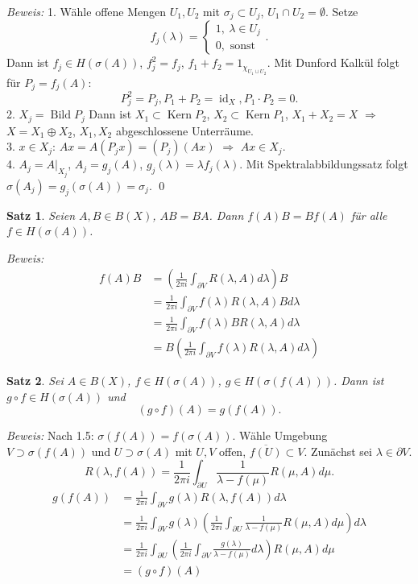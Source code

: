 \documentclass[12pt]{extreport} %
\newtheorem{Satz}{Satz}[subsection]
\DeclareMathOperator{\Kern}{Kern}
\DeclareMathOperator{\Bild}{Bild}
\DeclareMathOperator{\id}{id}
\numberwithin{equation}{section}
\newcommand{\m}{\cdot}
\newcommand{\Bew}{\emph{Beweis: }}
\begin{document}
	\Bew 1. Wähle offene Mengen $U_1,U_2$ mit $\sigma_j\subset U_j$, $U_1\cap U_2 = \emptyset$. Setze 
	$$f_j(\lambda) =\left\{ \begin{array}{l}
	1,~ \lambda \in U_j\\0, \text{ sonst}
	\end{array} \right. .$$
	Dann ist $f_j\in H(\sigma(A))$, $f_j^2 = f_j$, $f_1 + f_2 = 1_{\chi_{U_1\cup U_2}}$. Mit Dunford Kalkül folgt für $P_j = f_j(A)$:
	$$P_j^2 = P_j, P_1+P_2 = \id_X, P_1\m P_2 = 0.$$ 
	2. $X_j = \Bild P_j$
	Dann ist $X_1\subset \Kern P_2$, $X_2\subset \Kern P_1$, $X_1+X_2 = X$ $\Rightarrow$ $X=X_1\oplus X_2$, $X_1,X_2$ abgeschlossene Unterräume.\\
	3. $x\in X_j$: $Ax = A(P_jx) = (P_j)(Ax)$ $\Rightarrow$ $Ax\in X_j$.\\
	4. $A_j = A|_{X_j}$, $A_j = g_j(A)$, $g_j(\lambda) = \lambda f_j(\lambda)$. Mit Spektralabbildungssatz folgt $\sigma(A_j) = g_j(\sigma(A)) = \sigma_j$.
	\qed
	
	\begin{Satz}
		Seien $A,B\in B(X)$, $AB = BA$. Dann $f(A)B = Bf(A)$ für alle $f\in H(\sigma(A))$.
	\end{Satz}
	
	\Bew 
	\begin{align*}
		f(A)B &= \left(\frac{1}{2\pi i} \int_{\partial V} R(\lambda, A) d\lambda \right) B\\
		&= \frac{1}{2\pi i} \int_{\partial V} f(\lambda) R(\lambda, A)B d\lambda\\
		&= \frac{1}{2\pi i} \int_{\partial V} f(\lambda) BR(\lambda, A) d\lambda \\
		&= B\left(\frac{1}{2\pi i} \int_{\partial V} f(\lambda) R(\lambda, A) d\lambda \right)
	\end{align*}
	
	\begin{Satz}
		Sei $A\in B(X)$, $f\in H(\sigma(A))$, $g\in H(\sigma(f(A)))$. Dann ist $g\circ f\in H(\sigma(A))$ und 
		$$(g\circ f) (A)  = g(f(A)).$$
	\end{Satz}
	
	\Bew Nach 1.5: $\sigma(f(A)) = f(\sigma(A))$. Wähle Umgebung $V\supset \sigma(f(A))$ und $U\supset \sigma(A)$ mit $U,V$ offen, $\overline{f(U)}\subset V$. Zunächst sei $\lambda\in \partial V$. 
	$$R(\lambda, f(A)) = \frac{1}{2\pi i} \int_{\partial U} \frac{1}{\lambda - f(\mu)} R(\mu, A) d\mu.$$
	\begin{align*}
		g(f(A)) &= \frac{1}{2\pi i} \int_{\partial V} g(\lambda) R(\lambda, f(A)) d\lambda\\
		&= \frac{1}{2\pi i} \int_{\partial V} g(\lambda)\left( \frac{1}{2\pi i} \int_{\partial U} \frac{1}{\lambda - f(\mu)} R(\mu,A) d\mu \right)d\lambda\\
		&= \frac{1}{2\pi i} \int_{\partial U} \left(\frac{1}{2\pi i} \int_{\partial V} \frac{g(\lambda)}{\lambda - f(\mu)} d\lambda \right) R(\mu, A) d\mu\\
		&=(g\circ f)(A)
	\end{align*}
	
\end{document}
